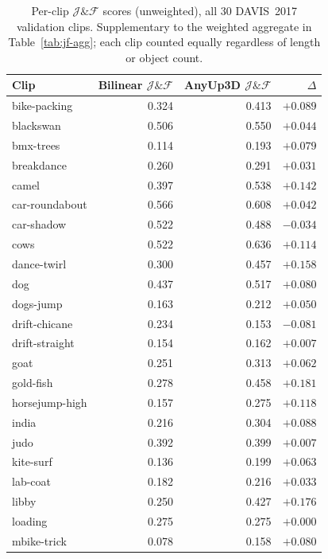\begin{table}[t]
\centering
\caption{%
    Per-clip $\mathcal{J}\&\mathcal{F}$ scores (unweighted), all 30 DAVIS~2017 validation clips.
    Supplementary to the weighted aggregate in Table~\ref{tab:jf-agg}; each clip counted equally regardless of length or object count.
}
\label{tab:jf-perclip}
\footnotesize
\begin{tabular}{lrrr}
\toprule
\textbf{Clip} & \textbf{Bilinear} $\mathcal{J\&F}$ & \textbf{AnyUp3D} $\mathcal{J\&F}$ & $\Delta$ \\
\midrule
bike-packing        & 0.324 & 0.413 & $+0.089$ \\
blackswan            & 0.506 & 0.550 & $+0.044$ \\
bmx-trees            & 0.114 & 0.193 & $+0.079$ \\
breakdance           & 0.260 & 0.291 & $+0.031$ \\
camel                & 0.397 & 0.538 & $+0.142$ \\
car-roundabout       & 0.566 & 0.608 & $+0.042$ \\
car-shadow           & 0.522 & 0.488 & $-0.034$ \\
cows                 & 0.522 & 0.636 & $+0.114$ \\
dance-twirl          & 0.300 & 0.457 & $+0.158$ \\
dog                  & 0.437 & 0.517 & $+0.080$ \\
dogs-jump            & 0.163 & 0.212 & $+0.050$ \\
drift-chicane        & 0.234 & 0.153 & $-0.081$ \\
drift-straight       & 0.154 & 0.162 & $+0.007$ \\
goat                 & 0.251 & 0.313 & $+0.062$ \\
gold-fish            & 0.278 & 0.458 & $+0.181$ \\
horsejump-high       & 0.157 & 0.275 & $+0.118$ \\
india                & 0.216 & 0.304 & $+0.088$ \\
judo                 & 0.392 & 0.399 & $+0.007$ \\
kite-surf            & 0.136 & 0.199 & $+0.063$ \\
lab-coat             & 0.182 & 0.216 & $+0.033$ \\
libby                & 0.250 & 0.427 & $+0.176$ \\
loading              & 0.275 & 0.275 & $+0.000$ \\
mbike-trick          & 0.078 & 0.158 & $+0.080$ \\

\end{tabular}
\end{table}
